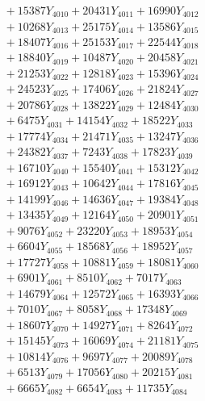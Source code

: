 \documentclass[a4paper,10pt]{article}
\begin{document}
{\begin{align}
&\;  + 15387 Y_{4010} + 20431 Y_{4011} + 16990 Y_{4012} \\[0.3ex]
&\;  + 10268 Y_{4013} + 25175 Y_{4014} + 13586 Y_{4015} \\[0.3ex]
&\;  + 18407 Y_{4016} + 25153 Y_{4017} + 22544 Y_{4018} \\[0.5ex]\allowbreak
&\;  + 18840 Y_{4019} + 10487 Y_{4020} + 20458 Y_{4021} \\[0.3ex]
&\;  + 21253 Y_{4022} + 12818 Y_{4023} + 15396 Y_{4024} \\[0.3ex]
&\;  + 24523 Y_{4025} + 17406 Y_{4026} + 21824 Y_{4027} \\[0.3ex]
&\;  + 20786 Y_{4028} + 13822 Y_{4029} + 12484 Y_{4030} \\[0.3ex]
&\;  + 6475 Y_{4031} + 14154 Y_{4032} + 18522 Y_{4033} \\[0.3ex]
&\;  + 17774 Y_{4034} + 21471 Y_{4035} + 13247 Y_{4036} \\[0.3ex]
&\;  + 24382 Y_{4037} + 7243 Y_{4038} + 17823 Y_{4039} \\[0.3ex]
&\;  + 16710 Y_{4040} + 15540 Y_{4041} + 15312 Y_{4042} \\[0.3ex]
&\;  + 16912 Y_{4043} + 10642 Y_{4044} + 17816 Y_{4045} \\[0.3ex]
&\;  + 14199 Y_{4046} + 14636 Y_{4047} + 19384 Y_{4048} \\[0.5ex]\allowbreak
&\;  + 13435 Y_{4049} + 12164 Y_{4050} + 20901 Y_{4051} \\[0.3ex]
&\;  + 9076 Y_{4052} + 23220 Y_{4053} + 18953 Y_{4054} \\[0.3ex]
&\;  + 6604 Y_{4055} + 18568 Y_{4056} + 18952 Y_{4057} \\[0.3ex]
&\;  + 17727 Y_{4058} + 10881 Y_{4059} + 18081 Y_{4060} \\[0.3ex]
&\;  + 6901 Y_{4061} + 8510 Y_{4062} + 7017 Y_{4063} \\[0.3ex]
&\;  + 14679 Y_{4064} + 12572 Y_{4065} + 16393 Y_{4066} \\[0.3ex]
&\;  + 7010 Y_{4067} + 8058 Y_{4068} + 17348 Y_{4069} \\[0.3ex]
&\;  + 18607 Y_{4070} + 14927 Y_{4071} + 8264 Y_{4072} \\[0.3ex]
&\;  + 15145 Y_{4073} + 16069 Y_{4074} + 21181 Y_{4075} \\[0.3ex]
&\;  + 10814 Y_{4076} + 9697 Y_{4077} + 20089 Y_{4078} \\[0.5ex]\allowbreak
&\;  + 6513 Y_{4079} + 17056 Y_{4080} + 20215 Y_{4081} \\[0.3ex]
&\;  + 6665 Y_{4082} + 6654 Y_{4083} + 11735 Y_{4084} \\[0.3ex]

\end{align}}
\end{document}
